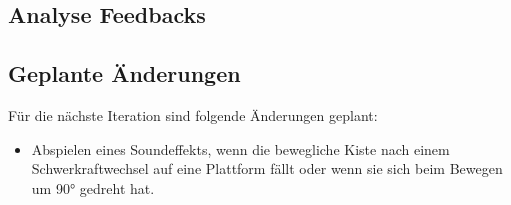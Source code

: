 \documentclass{article}
\begin{document}
\subsection{Analyse Feedbacks}

\subsection{Geplante Änderungen}

Für die nächste Iteration sind folgende Änderungen geplant:

\begin{itemize}
    \item Abspielen eines Soundeffekts, wenn die bewegliche Kiste nach einem Schwerkraftwechsel auf eine Plattform fällt oder wenn sie sich beim Bewegen um 90° gedreht hat.
\end{itemize}
\end{document}
